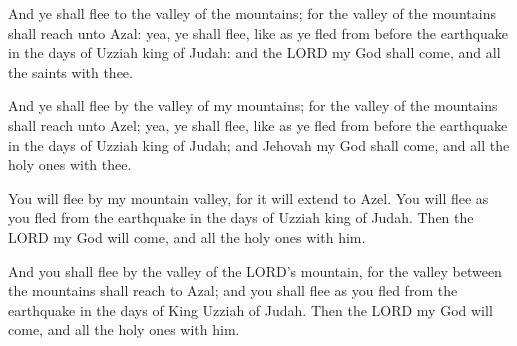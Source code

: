 			And ye shall flee to the valley of the mountains; for the valley of the mountains shall reach unto Azal: yea, ye shall flee, like as ye fled from before the earthquake in the days of Uzziah king of Judah: and the LORD my God shall come, and all the saints with thee.

			\begin{versebox}
					\item[BHS] 
					\item[LXX] 
					\item[ASV] And ye shall flee by the valley of my mountains; for the valley of the mountains shall reach unto Azel; yea, ye shall flee, like as ye fled from before the earthquake in the days of Uzziah king of Judah; and Jehovah my God shall come, and all the holy ones with thee.
					\item[NIV] You will flee by my mountain valley, for it will extend to Azel. You will flee as you fled from the earthquake in the days of Uzziah king of Judah. Then the LORD my God will come, and all the holy ones with him.
					\item[NRSV] And you shall flee by the valley of the LORD’s mountain, for the valley between the mountains shall reach to Azal; and you shall flee as you fled from the earthquake in the days of King Uzziah of Judah. Then the LORD my God will come, and all the holy ones with him.
			\end{versebox}

